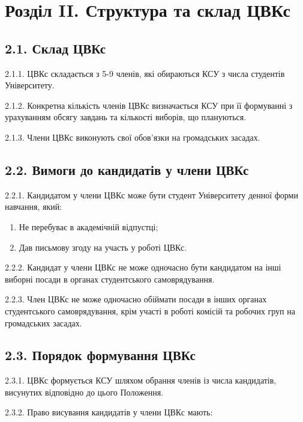 \section*{Розділ II. Структура та склад ЦВКс}

\subsection*{2.1. Склад ЦВКс}
    2.1.1. ЦВКс складається з 5-9 членів, які обираються КСУ з числа студентів Університету.

    2.1.2. Конкретна кількість членів ЦВКс визначається КСУ при її формуванні з урахуванням обсягу завдань та кількості виборів, що плануються.

    2.1.3. Члени ЦВКс виконують свої обов'язки на громадських засадах.

\subsection*{2.2. Вимоги до кандидатів у члени ЦВКс}
    2.2.1. Кандидатом у члени ЦВКс може бути студент Університету денної форми навчання, який:

        \begin{enumerate}[label=\alph*)]
            \item Не перебуває в академічній відпустці;
            \item Дав письмову згоду на участь у роботі ЦВКс.
        \end{enumerate}

    2.2.2. Кандидат у члени ЦВКс не може одночасно бути кандидатом на інші виборні посади в органах студентського самоврядування.

    2.2.3. Член ЦВКс не може одночасно обіймати посади в інших органах студентського самоврядування, крім участі в роботі комісій та робочих груп на громадських засадах.

\subsection*{2.3. Порядок формування ЦВКс}
    2.3.1. ЦВКс формується КСУ шляхом обрання членів із числа кандидатів, висунутих відповідно до цього Положення.

    2.3.2. Право висування кандидатів у члени ЦВКс мають:

